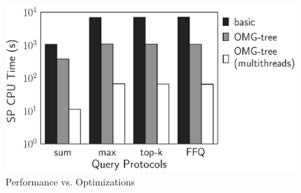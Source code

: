 
\begin{figure}[t]
  \centering
  \includegraphics[width=0.5\linewidth]{exp-figs/aggregate-queries/opt.eps}
  \caption{Performance vs. Optimizations}\label{fig:aggregate-queries:opt}
\end{figure}

